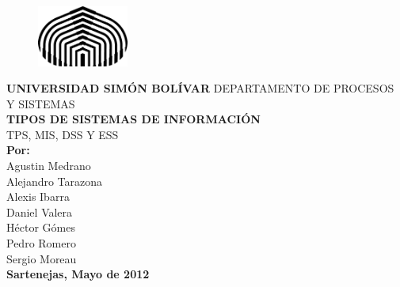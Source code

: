 \thispagestyle{empty}
\begin{center}
\vspace*{-1 in}
\begin{figure}[htb]
\begin{center}
\includegraphics[width=3cm]{logoUSB}
\end{center}
\end{figure}

\textbf {\Large UNIVERSIDAD SIMÓN BOLÍVAR}
DEPARTAMENTO DE PROCESOS Y SISTEMAS\\
[7cm]
\textbf {TIPOS DE SISTEMAS DE INFORMACIÓN} \\ 
TPS, MIS, DSS Y ESS\\
[3cm]
\textbf {Por:}\\
Agustin Medrano\\
Alejandro Tarazona\\
Alexis Ibarra\\
Daniel Valera\\
Héctor Gómes\\
Pedro Romero\\
Sergio Moreau\\
[3.5cm]
\textbf {Sartenejas, Mayo de 2012}
\end{center}
